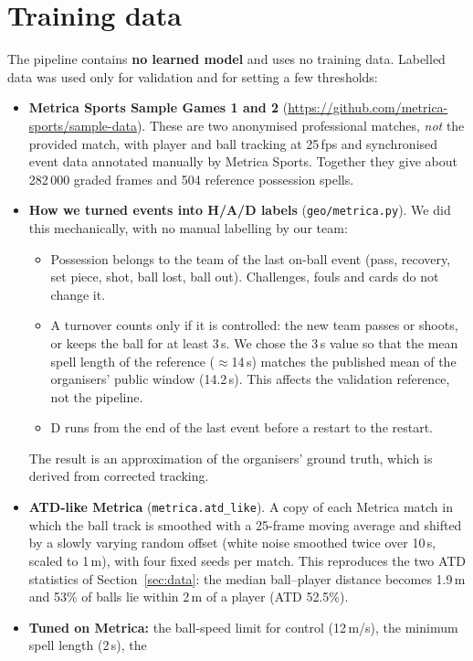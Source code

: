 \documentclass[11pt,a4paper]{article}
\newcommand{\code}[1]{\texttt{#1}}
\begin{document}
\section{Training data}
\label{sec:training}
The pipeline contains \textbf{no learned model} and uses no training data. Labelled data was used only for validation
and for setting a few thresholds:
\begin{itemize}
  \item \textbf{Metrica Sports Sample Games 1 and 2}
    (\url{https://github.com/metrica-sports/sample-data}). These are two anonymised professional matches, \emph{not}
    the provided match, with player and ball tracking at 25\,fps and synchronised event data annotated manually by
    Metrica Sports. Together they give about 282\,000 graded frames and 504 reference possession spells.
  \item \textbf{How we turned events into H/A/D labels} (\code{geo/metrica.py}). We did this mechanically, with no
    manual labelling by our team:
    \begin{itemize}
      \item Possession belongs to the team of the last on-ball event (pass, recovery, set piece, shot, ball lost, ball
        out). Challenges, fouls and cards do not change it.
      \item A turnover counts only if it is controlled: the new team passes or shoots, or keeps the ball for at least
        3\,s. We chose the 3\,s value so that the mean spell length of the reference ($\approx$14\,s) matches the
        published mean of the organisers' public window (14.2\,s). This affects the validation reference, not the
        pipeline.
      \item D runs from the end of the last event before a restart to the restart.
    \end{itemize}
    The result is an approximation of the organisers' ground truth, which is derived from corrected tracking.
  \item \textbf{ATD-like Metrica} (\code{metrica.atd\_like}). A copy of each Metrica match in which the ball track is
    smoothed with a 25-frame moving average and shifted by a slowly varying random offset (white noise smoothed twice
    over 10\,s, scaled to 1\,m), with four fixed seeds per match. This reproduces the two ATD statistics of
    Section~\ref{sec:data}: the median ball--player distance becomes 1.9\,m and 53\% of balls lie within 2\,m of a
    player (ATD 52.5\%).
  \item \textbf{Tuned on Metrica:} the ball-speed limit for control (12\,m/s), the minimum spell length (2\,s), the

\end{itemize}
\end{document}
